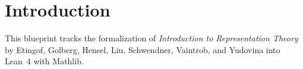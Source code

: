 %

\chapter{Introduction}

This blueprint tracks the formalization of
\emph{Introduction to Representation Theory}
by Etingof, Golberg, Hensel, Liu, Schwendner, Vaintrob, and Yudovina
into Lean~4 with Mathlib.
